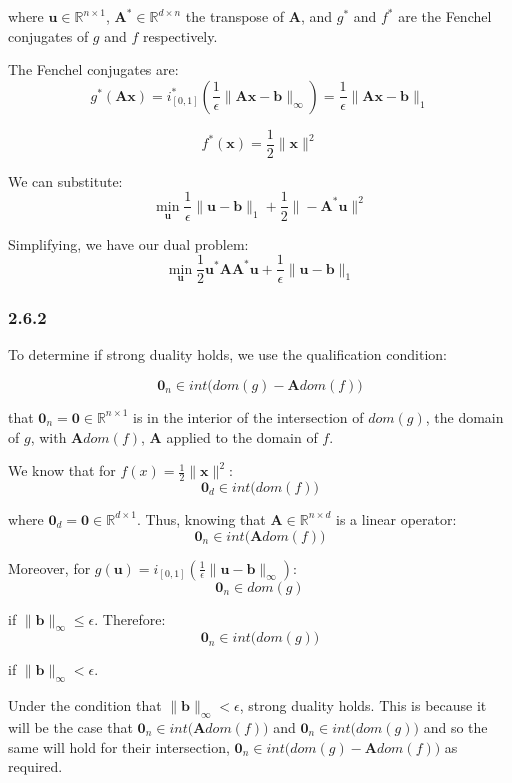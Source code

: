 \documentclass[12pt]{article}
\begin{document}
where $\textbf{u} \in \mathbb{R}^{n \times 1}$, $\textbf{A}^* \in \mathbb{R}^{d\times n}$ the transpose of $\textbf{A}$, and $g^*$ and $f^*$ are the Fenchel conjugates of $g$ and $f$ respectively.

The Fenchel conjugates are:
\[g^*(\textbf{Ax}) = i^*_{[0, 1]}\left(\frac{1}{\epsilon}\|\textbf{A}\textbf{x} - \textbf{b}\|_{\infty}\right) = \frac{1}{\epsilon} \| \textbf{A}\textbf{x} - \textbf{b}\|_1\]

\[f^*(\textbf{x}) =  \frac{1}{2}\|\textbf{x}\|^2\]

We can substitute:
\[\min_{\textbf{u}}  \frac{1}{\epsilon} \| \textbf{u} - \textbf{b}\|_1 +  \frac{1}{2}\|-\textbf{A}^*\textbf{u}\|^2\]

Simplifying, we have our dual problem:
\[\min_{\textbf{u}} \frac{1}{2}\textbf{u}^*\textbf{A}\textbf{A}^*\textbf{u} + \frac{1}{\epsilon} \| \textbf{u} - \textbf{b}\|_1\]

\subsubsection*{2.6.2}

To determine if strong duality holds, we use the qualification condition:

\[\textbf{0}_n \in int \big(dom(g) - \textbf{A}dom(f)\big)\]

that $\textbf{0}_n = \textbf{0} \in \mathbb{R}^{n \times 1}$ is in the interior of the intersection of  $dom(g)$, the domain of $g$, with $\textbf{A}dom(f)$, $\textbf{A}$ applied to the domain of $f$.

We know that for $f(x) = \frac{1}{2}\|\textbf{x}\|^2$:
\[\textbf{0}_d \in int \big(dom(f)\big)\]

where $\textbf{0}_d = \textbf{0} \in \mathbb{R}^{d \times 1}$. Thus, knowing that $\textbf{A} \in \mathbb{R}^{n\times d}$ is a linear operator:
\[\textbf{0}_n \in int \big(\textbf{A} dom(f)\big)\]

Moreover, for $g(\textbf{u}) =  i_{[0, 1]}\left(\frac{1}{\epsilon}\|\textbf{u} - \textbf{b}\|_{\infty}\right)$:
\[\textbf{0}_n \in dom(g)\]

if $\|\textbf{b}\|_{\infty} \leq \epsilon$. Therefore:
\[\textbf{0}_n \in int \big(dom(g)\big)\]

if $\|\textbf{b}\|_{\infty} < \epsilon$.

Under the condition that $\|\textbf{b}\|_{\infty} < \epsilon$, strong duality holds. This is because it will be the case that $\textbf{0}_n \in int \big(\textbf{A} dom(f)\big)$ and $\textbf{0}_n \in int \big(dom(g)\big)$ and so the same will hold for their intersection, $\textbf{0}_n \in int \big(dom(g) - \textbf{A}dom(f)\big)$ as required.
\end{document}
